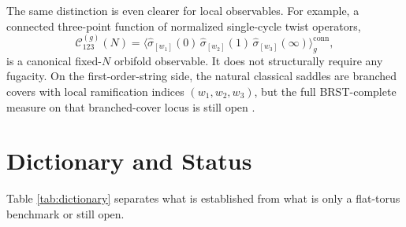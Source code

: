 \documentclass[11pt]{article}
\newcommand{\mc}[1]{\mathcal{#1}}
\begin{document}
The same distinction is even clearer for local observables. For example, a connected three-point function of normalized single-cycle twist operators,
\begin{equation}\label{eq:canonical-three-point}
\mc C_{123}^{(g)}(N)=
\bigl\langle
\widehat{\sigma}_{[w_1]}(0)\,
\widehat{\sigma}_{[w_2]}(1)\,
\widehat{\sigma}_{[w_3]}(\infty)
\bigr\rangle_{g}^{\mathrm{conn}},
\end{equation}
is a canonical fixed-$N$ orbifold observable. It does not structurally require any fugacity. On the first-order-string side, the natural classical saddles are branched covers with local ramification indices $(w_1,w_2,w_3)$, but the full BRST-complete measure on that branched-cover locus is still open \cite{lunin2001correlationorbifolds,lunin2002threepointorbifolds,pakman2009diagramssymmetricorbifold,pakman2009extremalhurwitz}.

\section{Dictionary and Status}
Table \ref{tab:dictionary} separates what is established from what is only a flat-torus benchmark or still open.
\end{document}
